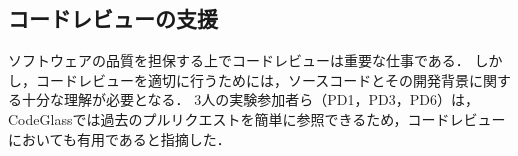 







\subsection*{コードレビューの支援}

ソフトウェアの品質を担保する上でコードレビューは重要な仕事である．
しかし，コードレビューを適切に行うためには，ソースコードとその開発背景に関する十分な理解が必要となる．
3人の実験参加者ら（PD1，PD3，PD6）は，CodeGlassでは過去のプルリクエストを簡単に参照できるため，コードレビューにおいても有用であると指摘した．


